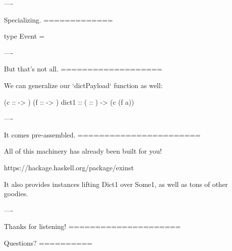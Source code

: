 ----

Specializing.
=============

\begin{raw}
  type Event = 
\end{raw}

----

But that's not all.
===================

We can generalize our `dictPayload` function as well:

\begin{custom}
    (c ::  -> )
              (f ::   -> ) 
    dict1 ::  ( :: ) ->  (c (f a))
\end{custom}

----

It comes pre-assembled.
=======================

All of this machinery has already been built for you!

https://hackage.haskell.org/package/exinst

It also provides instances lifting Dict1 over Some1, as well as tons of other goodies.

----

Thanks for listening!
=====================

Questions?
==========

